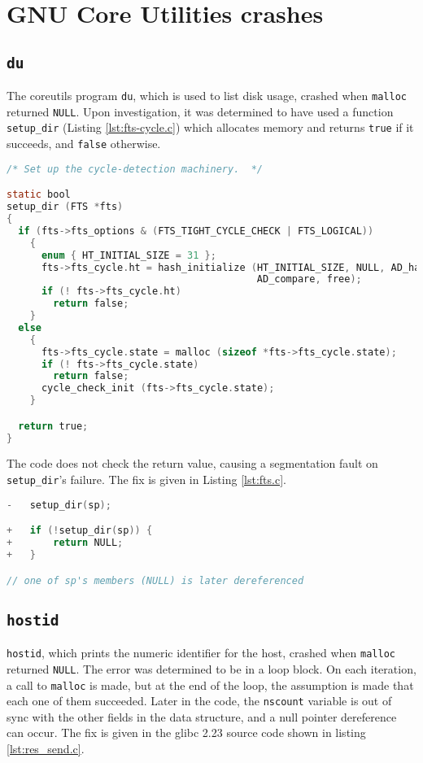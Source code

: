 \section{GNU Core Utilities crashes}
\label{appendix:coreutils}
\subsection{\texttt{du}}
The coreutils program \texttt{du}, which is used to list disk usage, crashed when \texttt{malloc} returned \texttt{NULL}. Upon investigation, it was determined to have used a function \texttt{setup\_dir} (Listing \ref{lst:fts-cycle.c}) which allocates memory and returns \texttt{true} if it succeeds, and \texttt{false} otherwise.

\begin{lstlisting}[label={lst:fts-cycle.c},firstnumber=47, caption={\texttt{lib/fts-cycle.c}}, language=C]
/* Set up the cycle-detection machinery.  */

static bool
setup_dir (FTS *fts)
{
  if (fts->fts_options & (FTS_TIGHT_CYCLE_CHECK | FTS_LOGICAL))
    {
      enum { HT_INITIAL_SIZE = 31 };
      fts->fts_cycle.ht = hash_initialize (HT_INITIAL_SIZE, NULL, AD_hash,
                                           AD_compare, free);
      if (! fts->fts_cycle.ht)
        return false;
    }
  else
    {
      fts->fts_cycle.state = malloc (sizeof *fts->fts_cycle.state);
      if (! fts->fts_cycle.state)
        return false;
      cycle_check_init (fts->fts_cycle.state);
    }

  return true;
}
\end{lstlisting}

The code does not check the return value, causing a segmentation fault on \texttt{setup\_dir}'s failure.
 The fix is given in Listing \ref{lst:fts.c}.
\begin{lstlisting}[label={lst:fts.c},firstnumber=986, caption={\texttt{lib/fts.c}}, language=C]
-	setup_dir(sp);

+	if (!setup_dir(sp)) {
+		return NULL;
+	}

// one of sp's members (NULL) is later dereferenced
\end{lstlisting}

\subsection{\texttt{hostid}}
\texttt{hostid}, which prints the numeric identifier for the host, crashed when \texttt{malloc} returned \texttt{NULL}. The error was determined to be in a loop block. On each iteration, a call to \texttt{malloc} is made, but at the end of the loop, the assumption is made that each one of them succeeded. Later in the code, the \texttt{nscount} variable is out of sync with the other fields in the data structure, and a null pointer dereference can occur. The fix is given in the glibc 2.23 source code shown in listing \ref{lst:res_send.c}.

